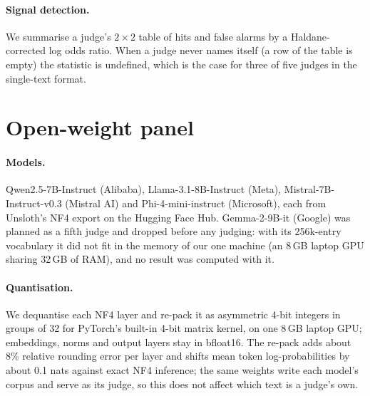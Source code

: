 \paragraph{Signal detection.} We summarise a judge's $2\times2$ table of hits
and false alarms by a Haldane-corrected log odds ratio. When a judge never
names itself (a row of the table is empty) the statistic is undefined, which
is the case for three of five judges in the single-text format.

\section{Open-weight panel}
\label{app:openweight}

\paragraph{Models.} Qwen2.5-7B-Instruct (Alibaba), Llama-3.1-8B-Instruct
(Meta), Mistral-7B-Instruct-v0.3 (Mistral AI) and Phi-4-mini-instruct
(Microsoft), each from Unsloth's NF4 export on the Hugging Face Hub.
Gemma-2-9B-it (Google) was planned as a fifth judge and dropped before any
judging: with its 256k-entry vocabulary it did not fit in the memory of our
one machine (an 8\,GB laptop GPU sharing 32\,GB of RAM), and no result was
computed with it.

\paragraph{Quantisation.} We dequantise each NF4 layer and re-pack it as asymmetric
4-bit integers in groups of 32 for PyTorch's built-in 4-bit matrix kernel,
on one 8\,GB laptop GPU; embeddings, norms and output layers stay in
bfloat16. The re-pack adds about 8\% relative rounding error per layer and
shifts mean token log-probabilities by about 0.1 nats against exact NF4
inference; the same weights write each model's corpus and serve as its
judge, so this does not affect which text is a judge's own.

